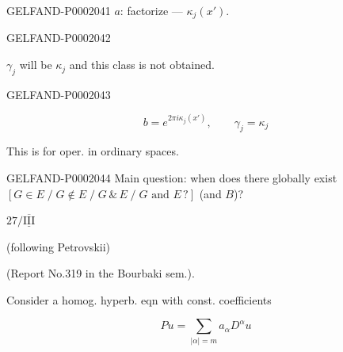 \begin{GelfandAdjacentEvidence}{GELFAND-P000204}{1}
$a$: factorize --- $\kappa_j (x')$.
\end{GelfandAdjacentEvidence}
\begin{GelfandAdjacentEvidence}{GELFAND-P000204}{2}

$\gamma_j$ will be $\kappa_j$ and this class is not obtained.
\end{GelfandAdjacentEvidence}
\begin{GelfandAdjacentEvidence}{GELFAND-P000204}{3}

\begin{equation*}b=e^{2\pi i\kappa_j (x')},\qquad\gamma_j=\kappa_j\end{equation*}
\end{GelfandAdjacentEvidence}

This is for oper. in ordinary spaces.



\begin{GelfandAdjacentEvidence}{GELFAND-P000204}{4}
Main question: when does there globally exist $[G\in E\;/\; G\notin E\;/\; G\,\&\, E\;/\; G\text{ and }E\,?]$ (and $B$)?
\end{GelfandAdjacentEvidence}

$27/\overline{\underline{\mathrm{III}}}$\quad{}



(following Petrovskii)



(Report No.319 in the Bourbaki sem.).



Consider a homog. hyperb. eqn with const. coefficients



\begin{equation*}Pu=\sum_{|\alpha|=m}a_\alpha D^\alpha u\end{equation*}



